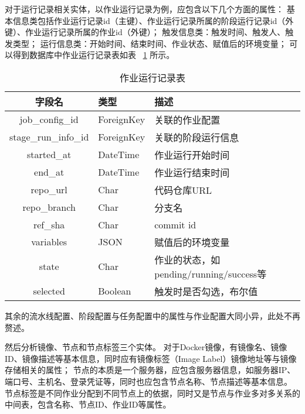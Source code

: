 对于运行记录相关实体，以作业运行记录为例，应包含以下几个方面的属性：
基本信息类包括作业运行记录id（主键）、作业运行记录所属的阶段运行记录id（外键）、作业运行记录所属的作业id（外键）；
触发信息类：触发时间、触发人、触发类型；
运行信息类：开始时间、结束时间、作业状态、赋值后的环境变量；
可以得到数据库中作业运行记录表如表~ \ref{tab:作业运行记录表} 所示。

\begin{table}[h]
  \centering
  \caption{作业运行记录表}
  \label{tab:作业运行记录表}
  \begin{tabular}{cll}
    \toprule
    字段名               & 类型          & 描述                                               \\
    \midrule
    job\_config\_id     & ForeignKey   & 关联的作业配置                                     \\
    stage\_run\_info\_id    & ForeignKey   & 关联的阶段运行信息                                 \\
    started\_at         & DateTime     & 作业运行开始时间                                   \\
    end\_at             & DateTime     & 作业运行结束时间                                   \\
    repo\_url           & Char         & 代码仓库URL                                      \\
    repo\_branch        & Char         & 分支名                                           \\
    ref\_sha            & Char         & commit id                                       \\
    variables           & JSON         & 赋值后的环境变量                                  \\
    state               & Char         & 作业的状态，如pending/running/success等            \\
    selected            & Boolean      & 触发时是否勾选，布尔值                             \\
    \bottomrule
  \end{tabular}
\end{table}

其余的流水线配置、阶段配置与任务配置中的属性与作业配置大同小异，此处不再赘述。

然后分析镜像、节点和节点标签三个实体。
对于Docker镜像，有镜像名、镜像ID、镜像描述等基本信息，同时应有镜像标签（Image Label）镜像地址等与镜像存储相关的属性；
节点的本质是一个服务器，应包含服务器信息，如服务器IP、端口号、主机名、登录凭证等，同时也应包含节点名称、节点描述等基本信息。
节点标签是不同作业分配到不同节点上的依据，同时又是节点与作业多对多关系的中间表，包含名称、节点ID、作业ID等属性。

